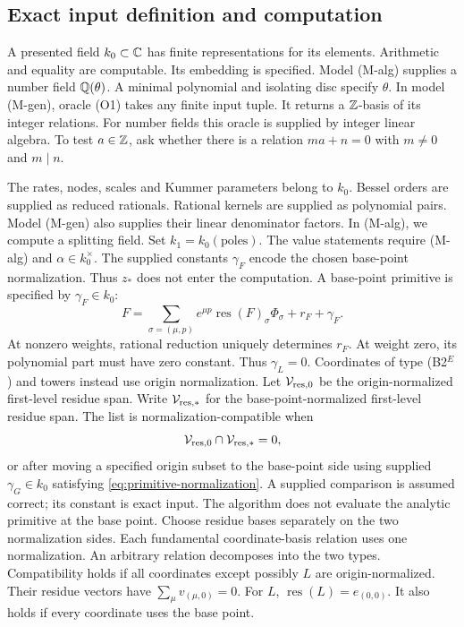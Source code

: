 \subsection{Exact input definition and computation}\label{sup:input-algorithm}
\label{subsec:input}
\begin{definition}\label{def:input}
A presented field $k_0\subset\mathbb{C}$ has finite representations for its elements.
Arithmetic and equality are computable. Its embedding is specified.
Model (M-alg) supplies a number field $\mathbb{Q}(\theta)$.
A minimal polynomial and isolating disc specify $\theta$.
In model (M-gen), oracle (O1) takes any finite input tuple.
It returns a $\mathbb{Z}$-basis of its integer relations.
For number fields this oracle is supplied by integer linear algebra.
To test $a\in\mathbb{Z}$, ask whether there is a relation $ma+n=0$ with
$m\ne0$ and $m\mid n$.

The rates, nodes, scales and Kummer parameters belong to $k_0$.
Bessel orders are supplied as reduced rationals.
Rational kernels are supplied as polynomial pairs.
Model (M-gen) also supplies their linear denominator factors.
In (M-alg), we compute a splitting field.
Set $k_1=k_0(\text{poles})$. The value statements require (M-alg) and
$\alpha\in k_0^\times$. The supplied constants $\gamma_F$ encode
the chosen base-point normalization. Thus $z_*$ does not enter the computation.
A base-point primitive is specified by $\gamma_F\in k_0$:
\begin{equation}\label{eq:primitive-normalization}
F=\sum_{\sigma=(\mu,p)}e^{\mu p}\operatorname{res}(F)_\sigma\Phi_\sigma+r_F+\gamma_F.
\end{equation}
At nonzero weights, rational reduction uniquely determines $r_F$.
At weight zero, its polynomial part must have zero constant.
Thus $\gamma_L=0$. Coordinates of type (B2$^E$) and towers instead use
origin normalization. Let $\mathcal V_{{\rm res},0}$ be the origin-normalized first-level residue span.
Write $\mathcal V_{{\rm res},*}$ for the base-point-normalized first-level residue span.
The list is normalization-compatible when
\begin{equation}\label{eq:compatibility}
\mathcal V_{{\rm res},0}\cap\mathcal V_{{\rm res},*}=0,
\end{equation}
or after moving a specified origin subset to the base-point side using
supplied $\gamma_G\in k_0$ satisfying \eqref{eq:primitive-normalization}.
A supplied comparison is assumed correct; its constant is exact input.
The algorithm does not evaluate the analytic primitive at the base point.
Choose residue bases separately on the two
normalization sides. Each fundamental coordinate-basis relation uses one normalization.
An arbitrary relation decomposes into the two types.
Compatibility holds if all coordinates except possibly $L$ are origin-normalized.
Their residue vectors have $\sum_\mu v_{(\mu,0)}=0$.
For $L$, $\operatorname{res}(L)=e_{(0,0)}$.
It also holds if every coordinate uses the base point.
\end{definition}

